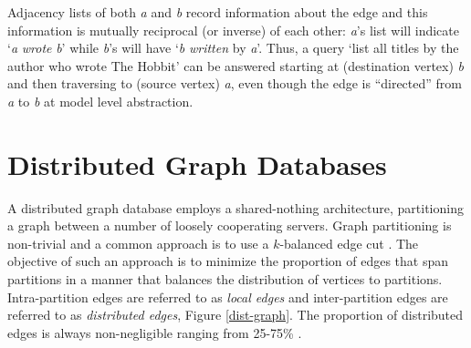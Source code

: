 \documentclass[sigplan,10pt]{acmart}
\begin{document}
Adjacency lists of both \emph{a} and \emph{b} record information about the edge and this information is mutually reciprocal (or inverse) of each other: \emph{a}'s list will indicate `\emph{a} \emph{wrote} \emph{b}' while \emph{b}'s will have `\emph{b} \emph{written} by \emph{a}'. Thus, a query `list all titles by the author who wrote The Hobbit' can be answered starting at (destination vertex) \emph{b} and then traversing to (source vertex) \emph{a}, even though the edge is ``directed'' from \emph{a} to \emph{b} at model level abstraction.

\section{Distributed Graph Databases}

A distributed graph database employs a shared-nothing architecture, partitioning a graph between a number of loosely cooperating servers. Graph partitioning is non-trivial and a common approach is to use a $k$-balanced edge cut \cite{Huang2016}. The objective of such an approach is to minimize the proportion of edges that span partitions in a manner that balances the distribution of vertices to partitions. Intra-partition edges are referred to as \textit{local edges} and inter-partition edges are referred to as \textit{distributed edges}, Figure \ref{dist-graph}. The proportion of distributed edges is always non-negligible ranging from 25-75\% \cite{Huang2016}.
\end{document}
